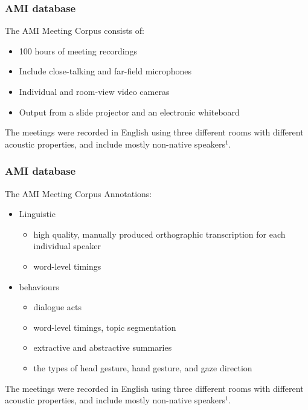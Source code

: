 \begin{frame}

  \frametitle{AMI database}
  The AMI Meeting Corpus consists of:
  \begin{center}
    \begin{itemize}
      \item 100 hours of meeting recordings
      \item Include close-talking and far-field microphones
      \item Individual and room-view video cameras
      \item Output from a slide projector and an electronic whiteboard
    \end{itemize}
  \end{center}
The meetings were recorded in English using three different rooms with different acoustic properties, and include mostly non-native speakers$^1$.
\end{frame}

\begin{frame}

  \frametitle{AMI database}
  The AMI Meeting Corpus Annotations:
  \begin{center}
    \begin{itemize}
      \item Linguistic
        \begin{itemize}
          \item high quality, manually produced orthographic transcription for each individual speaker
          \item word-level timings
        \end{itemize}
      \item behaviours
        \begin{itemize}
          \item dialogue acts
          \item word-level timings, topic segmentation
          \item extractive and abstractive summaries
          \item the types of head gesture, hand gesture, and gaze direction
        \end{itemize}      

    \end{itemize}
  \end{center}
The meetings were recorded in English using three different rooms with different acoustic properties, and include mostly non-native speakers$^1$.

\end{frame}
